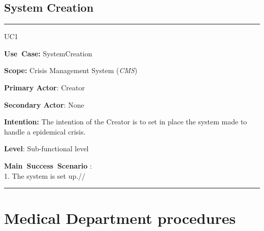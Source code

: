 \subsection{System Creation}
\vspace{0.5cm}
\hrule
\vspace{0.5cm}
\begin{lyxlist}{UC1}
\small{
\item [\textbf{Use~Case:}] SystemCreation
\item [\textbf{Scope:}] Crisis Management System (\emph{CMS})
\item [\textbf{Primary Actor}:] Creator
\item [\textbf{Secondary Actor}:] None
\item [\textbf{Intention:}] The intention of the Creator is to set in place the system made to handle a epidemical crisis. 
\item [\textbf{Level}:]Sub-functional level
\item [\textbf{Main~Success~Scenario}]:\\
1. The system is set up.// }
\end{lyxlist}
\hrule 
\vspace{0.5cm} 

\section{Medical Department procedures}

